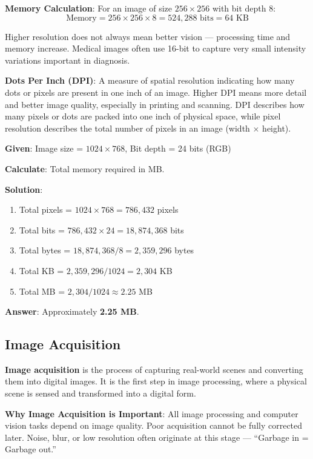 \documentclass[11pt,a4paper]{article}
\begin{document}
\textbf{Memory Calculation}: For an image of size $256 \times 256$ with bit depth 8:
\[
\text{Memory} = 256 \times 256 \times 8 = 524{,}288 \text{ bits} = 64 \text{ KB}
\]

Higher resolution does not always mean better vision --- processing time and memory increase. Medical images often use 16-bit to capture very small intensity variations important in diagnosis.

\textbf{Dots Per Inch (DPI)}: A measure of spatial resolution indicating how many dots or pixels are present in one inch of an image. Higher DPI means more detail and better image quality, especially in printing and scanning. DPI describes how many pixels or dots are packed into one inch of physical space, while pixel resolution describes the total number of pixels in an image (width $\times$ height).

\begin{tcolorbox}[colback=yellow!5!white,colframe=yellow!75!black,title=\textbf{Worked Example 1: Image Memory Calculation}]
\textbf{Given}: Image size = $1024 \times 768$, Bit depth = 24 bits (RGB)

\textbf{Calculate}: Total memory required in MB.

\textbf{Solution}:
\begin{enumerate}
    \item Total pixels = $1024 \times 768 = 786{,}432$ pixels
    \item Total bits = $786{,}432 \times 24 = 18{,}874{,}368$ bits
    \item Total bytes = $18{,}874{,}368 / 8 = 2{,}359{,}296$ bytes
    \item Total KB = $2{,}359{,}296 / 1024 = 2{,}304$ KB
    \item Total MB = $2{,}304 / 1024 \approx 2.25$ MB
\end{enumerate}

\textbf{Answer}: Approximately \textbf{2.25 MB}.
\end{tcolorbox}

\subsection{Image Acquisition}

\textbf{Image acquisition} is the process of capturing real-world scenes and converting them into digital images. It is the first step in image processing, where a physical scene is sensed and transformed into a digital form.

\textbf{Why Image Acquisition is Important}: All image processing and computer vision tasks depend on image quality. Poor acquisition cannot be fully corrected later. Noise, blur, or low resolution often originate at this stage --- ``Garbage in = Garbage out.''
\end{document}
